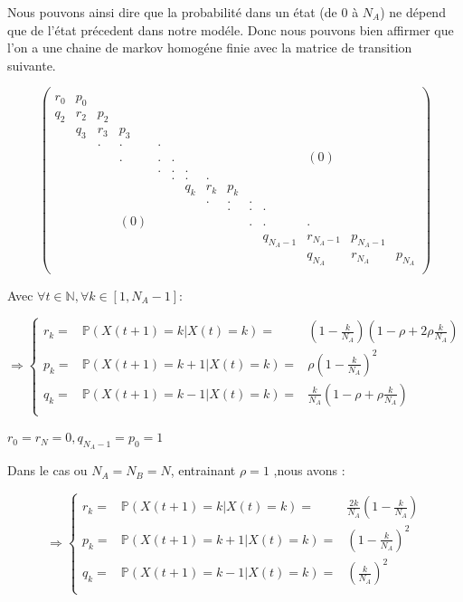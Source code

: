 \documentclass[11pt,]{article}
\begin{document}
Nous pouvons ainsi dire que la probabilité dans un état (de 0 à \(N_A\))
ne dépend que de l'état précedent dans notre modéle. Donc nous pouvons
bien affirmer que l'on a une chaine de markov homogéne finie avec la
matrice de transition suivante.

\[
\left(\begin{array}{cccccccccccccc}
\\r_0&p_0&&&&&&&&&&&&\\  
q_2&r_2&p_2&&&&&&&&&&&\\  
&q_3&r_3&p_3&&&&&&&&&&\\  
&&.&.&.&&&&&&&&&\\  
&&&.&.&.&&&&&&(0)&&\\  
&&&&.&.&.&&&&&&&\\  
&&&&&.&.&.&&&&&&\\  
&&&&&&q_k&r_k&p_k&&&&&\\  
&&&&&&&.&.&.&&&&\\  
&&&&&&&&.&.&.&&&\\  
&&&(0)&&&&&&.&.&.&&\\  
&&&&&&&&&&q_{N_A-1}&r_{N_A-1}&p_{N_A-1}&\\  
&&&&&&&&&&&q_{N_A}&r_{N_A}&p_{N_A}\\
\end{array}\right)\]

Avec \(\forall t \in \mathbb{N},\forall k \in [1,N_A-1]\):

\[ \Rightarrow \left\{
  \begin{array}{rcr}
  r_k=&\mathbb{P}(X(t+1)=k|X(t)=k)=&(1-\frac{k}{N_A})(1-\rho+2\rho\frac{k}{N_A})\\
  p_k=&\mathbb{P}(X(t+1)=k+1|X(t)=k)=&\rho(1-\frac{k}{N_A})^2\\
  q_k=&\mathbb{P}(X(t+1)=k-1|X(t)=k)=&\frac{k}{N_A}(1-\rho+\rho \frac{k}{N_A}) \\
\end{array}
\right.
\]

\(r_0=r_N=0,q_{N_A-1}=p_0=1\)

Dans le cas ou \(N_A=N_B=N\), entrainant \(\rho=1\) ,nous avons :

\[ \Rightarrow \left\{
  \begin{array}{rcr}
  r_k=&\mathbb{P}(X(t+1)=k|X(t)=k)=&\frac{2k}{N_A}(1-\frac{k}{N_A})\\
  p_k=&\mathbb{P}(X(t+1)=k+1|X(t)=k)=&(1-\frac{k}{N_A})^2\\
  q_k=& \mathbb{P}(X(t+1)=k-1|X(t)=k)=& (\frac{k}{N_A})^2\\
\end{array}
\right.
\]
\end{document}
